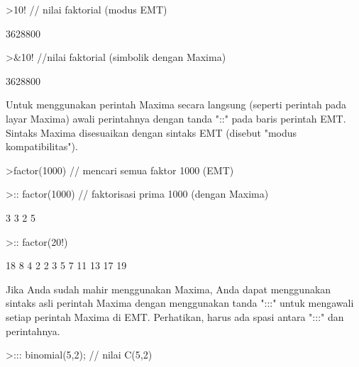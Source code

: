 \documentclass{article}
\begin{document}
\begin{eulernotebook}
\begin{eulercomment}
\begin{eulercomment}
\begin{eulercomment}
\begin{eulercomment}
\begin{euleroutput}
\end{euleroutput}
\begin{eulerprompt}
>10! // nilai faktorial (modus EMT)
\end{eulerprompt}
\begin{euleroutput}
  3628800
\end{euleroutput}
\begin{eulerprompt}
>&10! //nilai faktorial (simbolik dengan Maxima)
\end{eulerprompt}
\begin{euleroutput}
  
                                       3628800
  
\end{euleroutput}
\begin{eulercomment}
Untuk menggunakan perintah Maxima secara langsung (seperti perintah pada layar
Maxima) awali perintahnya dengan tanda "::" pada baris perintah EMT. Sintaks
Maxima disesuaikan dengan sintaks EMT (disebut "modus kompatibilitas").
\end{eulercomment}
\begin{eulerprompt}
>factor(1000) // mencari semua faktor 1000 (EMT)
\end{eulerprompt}
\begin{euleroutput}
  [2,  2,  2,  5,  5,  5]
\end{euleroutput}
\begin{eulerprompt}
>:: factor(1000) // faktorisasi prima 1000 (dengan Maxima) 
\end{eulerprompt}
\begin{euleroutput}
  
                                         3  3
                                        2  5
  
\end{euleroutput}
\begin{eulerprompt}
>:: factor(20!)
\end{eulerprompt}
\begin{euleroutput}
  
                               18  8  4  2
                              2   3  5  7  11 13 17 19
  
\end{euleroutput}
\begin{eulercomment}
Jika Anda sudah mahir menggunakan Maxima, Anda dapat menggunakan sintaks asli
perintah Maxima dengan menggunakan tanda ":::" untuk mengawali setiap perintah
Maxima di EMT. Perhatikan, harus ada spasi antara ":::" dan perintahnya.
\end{eulercomment}
\begin{eulerprompt}
>::: binomial(5,2); // nilai C(5,2)
\end{eulerprompt}
\begin{euleroutput}
  

\end{euleroutput}
\end{eulercomment}
\end{eulercomment}
\end{eulercomment}
\end{eulercomment}
\end{eulernotebook}
\end{document}
